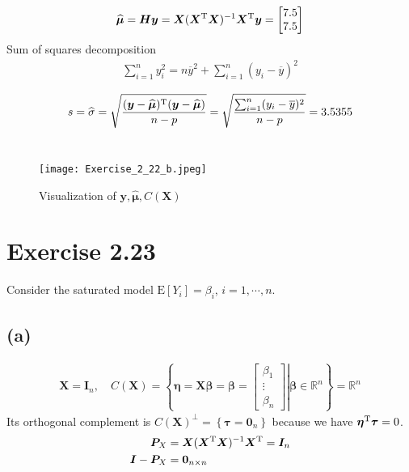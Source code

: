 \documentclass[a4paper]{article}
\newcommand{\E}{\mathrm{E}}
\begin{document}
\begin{align*}
\widehat{\bm{\mu}} = \bm{H}\bm{y} = \bm{X}(\bm{X}^{\rm T}\bm{X})^{-1}\bm{X}^{\rm T}\bm{y} = 
\begin{bmatrix}
7.5\\
7.5
\end{bmatrix}
\end{align*}
Sum of squares decomposition
\begin{align*}
\sum_{i=1}^{n} y_{i}^{2} = n\overline{y}^{2} + \sum_{i=1}^{n} (y_{i} - \overline{y})^{2} \tag{p.42 of the book}
\end{align*}

\begin{align*}
s = \widehat{\sigma} = \sqrt{\frac{(\bm{y} -\widehat{\bm{\mu}})^{\rm T}(\bm{y} -\widehat{\bm{\mu}})}{n-p}} = \sqrt{\frac{\sum_{i=1}^{n} (y_{i} - \overline{y})^{2}}{n-p}} = 3.5355
\end{align*}
\vspace{\baselineskip}\\

\begin{figure}[H]
    \centering
\texttt{[image: Exercise\_2\_22\_b.jpeg]}
\caption{Visualization of $\bm{y}, \widehat{\bm{\mu}}, C(\bm{X})$}
\end{figure}



\vspace{\baselineskip}
\section{Exercise 2.23}
Consider the saturated model $\E[Y_{i}] = \beta_{i}$, $i = 1, \cdots ,n$.
\subsection{(a)}
\begin{align*}
\bm{X}= \bm{I}_{n}
, \quad
C(\bm{X}) = \left\{\bm{\eta} = \bm{X}\bm{\beta} = \bm{\beta} = 
\begin{bmatrix}
\beta_{1}\\
\vdots\\
\beta_{n}
\end{bmatrix}
\left. \right\vert \bm{\beta} \in \mathbb{R}^{n}
\right\}
= \mathbb{R}^{n}
\end{align*}
Its orthogonal complement is
$C(\bm{X})^{\perp} = \left\{\bm{\tau} = \bm{0}_{n}\right\}$ because we have $\bm{\eta}^{\rm T}\bm{\tau} = 0$.\\
\begin{align*}
\bm{P}_{X} &= \bm{X}(\bm{X}^{\rm T}\bm{X})^{-1}\bm{X}^{\rm T}
= \bm{I}_{n}\\
\bm{I} - \bm{P}_{X} &= \bm{0}_{n \times n}
\end{align*}
\end{document}

